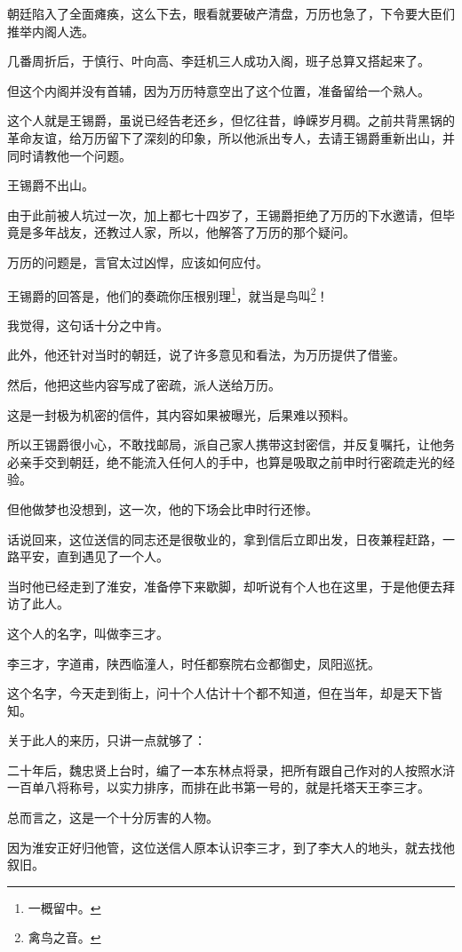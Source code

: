 \begin{multicols}{\theparacolNo}
朝廷陷入了全面瘫痪，这么下去，眼看就要破产清盘，万历也急了，下令要大臣们推举内阁人选。

几番周折后，于慎行、叶向高、李廷机三人成功入阁，班子总算又搭起来了。

但这个内阁并没有首辅，因为万历特意空出了这个位置，准备留给一个熟人。

这个人就是王锡爵，虽说已经告老还乡，但忆往昔，峥嵘岁月稠。之前共背黑锅的革命友谊，给万历留下了深刻的印象，所以他派出专人，去请王锡爵重新出山，并同时请教他一个问题。

王锡爵不出山。

由于此前被人坑过一次，加上都七十四岁了，王锡爵拒绝了万历的下水邀请，但毕竟是多年战友，还教过人家，所以，他解答了万历的那个疑问。

万历的问题是，言官太过凶悍，应该如何应付。

王锡爵的回答是，他们的奏疏你压根别理\footnote{一概留中。}，就当是鸟叫\footnote{禽鸟之音。}！

我觉得，这句话十分之中肯。

此外，他还针对当时的朝廷，说了许多意见和看法，为万历提供了借鉴。

然后，他把这些内容写成了密疏，派人送给万历。

这是一封极为机密的信件，其内容如果被曝光，后果难以预料。

所以王锡爵很小心，不敢找邮局，派自己家人携带这封密信，并反复嘱托，让他务必亲手交到朝廷，绝不能流入任何人的手中，也算是吸取之前申时行密疏走光的经验。

但他做梦也没想到，这一次，他的下场会比申时行还惨。

话说回来，这位送信的同志还是很敬业的，拿到信后立即出发，日夜兼程赶路，一路平安，直到遇见了一个人。

当时他已经走到了淮安，准备停下来歇脚，却听说有个人也在这里，于是他便去拜访了此人。

这个人的名字，叫做李三才。

李三才，字道甫，陕西临潼人，时任都察院右佥都御史，凤阳巡抚。

这个名字，今天走到街上，问十个人估计十个都不知道，但在当年，却是天下皆知。

关于此人的来历，只讲一点就够了：

二十年后，魏忠贤上台时，编了一本东林点将录，把所有跟自己作对的人按照水浒一百单八将称号，以实力排序，而排在此书第一号的，就是托塔天王李三才。

总而言之，这是一个十分厉害的人物。

因为淮安正好归他管，这位送信人原本认识李三才，到了李大人的地头，就去找他叙旧。


\end{multicols}
